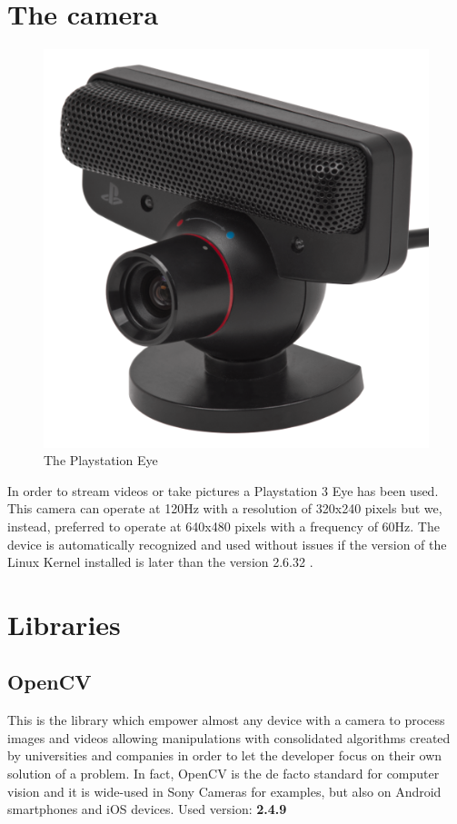 \section{The camera}
\begin{figure}[hbt]
    \vspace{1cm}
    \centering
    \caption{The Playstation Eye}
    \includegraphics{img/pseye.png}
    \vspace{1cm}
\end{figure}

In order to stream videos or take pictures a Playstation 3 Eye has been used.
This camera can operate at 120Hz with a resolution of 320x240 pixels but we, instead, preferred to operate at 640x480 pixels with a frequency of 60Hz.
The device is automatically recognized and used without issues if the version of the Linux Kernel installed is later than the version 2.6.32 .
 

\section{Libraries}

\subsection{OpenCV}
This is the library which empower almost any device with a camera to process images and videos allowing manipulations with consolidated algorithms created by universities and companies in order to let the developer focus on their own solution of a problem.
In fact, OpenCV is the de facto standard for computer vision and it is wide-used in Sony Cameras for examples, but also on Android smartphones and iOS devices. 
\newline Used version: \textbf{2.4.9}

